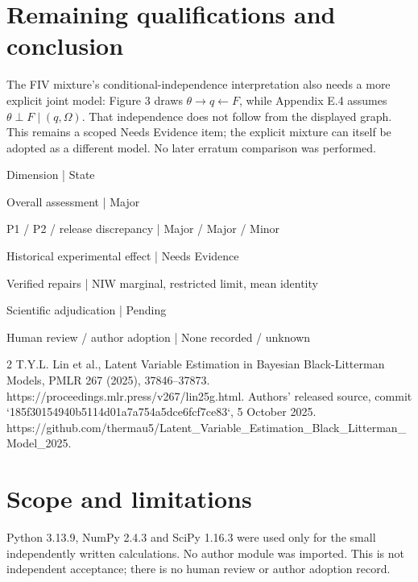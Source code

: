 \documentclass[10pt]{article}
\begin{document}
\section*{Remaining qualifications and conclusion}
The FIV mixture’s conditional-independence interpretation also needs a more explicit joint model: Figure 3 draws \(\theta\to q\leftarrow F\), while Appendix E.4 assumes \(\theta\perp F\mid(q,\Omega)\). That independence does not follow from the displayed graph. This remains a scoped Needs Evidence item; the explicit mixture can itself be adopted as a different model. No later erratum comparison was performed.\par
Dimension | State\par
Overall assessment | Major\par
P1 / P2 / release discrepancy | Major / Major / Minor\par
Historical experimental effect | Needs Evidence\par
Verified repairs | NIW marginal, restricted limit, mean identity\par
Scientific adjudication | Pending\par
Human review / author adoption | None recorded / unknown\par
2 T.Y.L. Lin et al., Latent Variable Estimation in Bayesian Black-Litterman Models, PMLR 267 (2025), 37846–37873. https://proceedings.mlr.press/v267/lin25g.html. Authors’ released source, commit `185f30154940b5114d01a7a754a5dce6fcf7ce83`, 5 October 2025. https://github.com/thermau5/Latent\_Variable\_Estimation\_Black\_Litterman\_Model\_2025.\par
\section*{Scope and limitations}
Python 3.13.9, NumPy 2.4.3 and SciPy 1.16.3 were used only for the small independently written calculations. No author module was imported. This is not independent acceptance; there is no human review or author adoption record.\par
\end{document}
